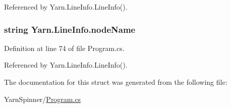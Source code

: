 Referenced by Yarn.\-Line\-Info.\-Line\-Info().

\hypertarget{a00131_a5a91331fb123e29d71d69e096f943c2f}{
\subsubsection[{node\-Name}]{\setlength{\rightskip}{0pt plus 5cm}string Yarn.\-Line\-Info.\-node\-Name}}\label{a00131_a5a91331fb123e29d71d69e096f943c2f}


Definition at line 74 of file Program.\-cs.



Referenced by Yarn.\-Line\-Info.\-Line\-Info().



The documentation for this struct was generated from the following file\-:\begin{DoxyCompactItemize}
\item 
Yarn\-Spinner/\hyperlink{a00314}{Program.\-cs}\end{DoxyCompactItemize}
